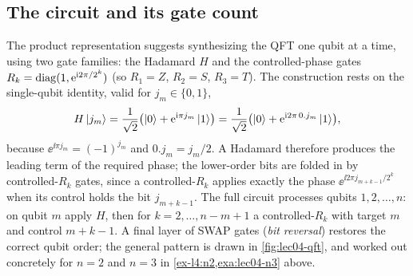 \subsection*{The circuit and its gate count}

The product representation suggests synthesizing the QFT one qubit at a time,
using two gate families: the Hadamard $H$ and the controlled-phase gates
$R_k=\operatorname{diag}(1,\mathrm{e}^{\mathrm{i} 2\pi/2^{k}})$ (so $R_1=Z$, $R_2=S$, $R_3=T$). The
construction rests on the single-qubit identity, valid for $j_m\in\{0,1\}$,
\[
  H\ket{j_m}=\frac{1}{\sqrt2}\bigl(\ket{0}+\mathrm{e}^{\mathrm{i}\pi j_m}\ket{1}\bigr)
            =\frac{1}{\sqrt2}\bigl(\ket{0}+\mathrm{e}^{\mathrm{i} 2\pi\,0.j_m}\ket{1}\bigr),
\]
because $\ee^{\ii\pi j_m}=(-1)^{j_m}$ and $0.j_m=j_m/2$. A Hadamard therefore
produces the leading term of the required phase; the lower-order bits are folded
in by controlled-$R_k$ gates, since a controlled-$R_k$ applies exactly the phase
$\ee^{\ii 2\pi j_{m+k-1}/2^{k}}$ when its control holds the bit $j_{m+k-1}$. The
full circuit processes qubits $1,2,\dots,n$: on qubit $m$ apply $H$, then for
$k=2,\dots,n-m+1$ a controlled-$R_k$ with target $m$ and control $m+k-1$. A final
layer of SWAP gates (\emph{bit reversal}) restores the correct qubit order; the
general pattern is drawn in \cref{fig:lec04-qft}, and worked out concretely for $n=2$
and $n=3$ in \cref{ex-l4:n2,exa:lec04-n3} above.

